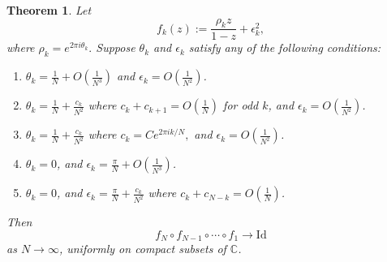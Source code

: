 \documentclass{amsart}
\newtheorem{mainthm}{Theorem}
\theoremstyle{remark}
\theoremstyle{definition}
\newcommand{\lp}{\left(}
\newcommand{\rp}{\right)}
\begin{document}
	\begin{mainthm} 
		Let
		\begin{equation*}
			f_k(z) := \frac{\rho_k z}{1-z} + \epsilon_k^2,
		\end{equation*}
		where $\rho_k=e^{2\pi i \theta_k}.$ Suppose $\theta_k$ and $\epsilon_k$ satisfy any of the following conditions:
		\begin{enumerate}
		\item
		$\displaystyle{\theta_k = \frac{1}{N} + O\lp\frac{1}{N^3}\rp}$ and $\displaystyle{\epsilon_k=  O\lp \frac{1}{N^2}\rp}$. 
		\item
		$\displaystyle{\theta_k = \frac{1}{N} + \frac{c_k}{N^2}}$ where $\displaystyle{c_k+c_{k+1}=O\lp \frac{1}{N}\rp}$ for odd $k$, and $\displaystyle{\epsilon_k=  O\lp \frac{1}{N^2}\rp}$. \\
        \item
  		$\displaystyle{\theta_k = \frac{1}{N} + \frac{c_k}{N^2}}$ where $\displaystyle{c_k = Ce^{2\pi ik/N},}$ and $\displaystyle{\epsilon_k=  O\lp \frac{1}{N^2}\rp}$. \\
		\item
		$\displaystyle{\theta_k = 0}$, and $\displaystyle{\epsilon_k=\frac{\pi}{N}+ O\lp \frac{1}{N^3}\rp}$. 
		\item
		$\displaystyle{\theta_k = 0}$, and $\displaystyle{\epsilon_k=\frac{\pi}{N}+  \frac{c_k}{N^2}}$ where $\displaystyle{c_k+c_{N-k}=O\lp \frac{1}{N}\rp}$. 
		\end{enumerate}
		Then 
		\begin{equation*}
			f_N\circ f_{N-1} \circ \cdots \circ f_1 \rightarrow \text{Id}
		\end{equation*}
        as $N\rightarrow\infty$, uniformly on compact subsets of $\mathbb{C}$.
	\end{mainthm}
\end{document}
